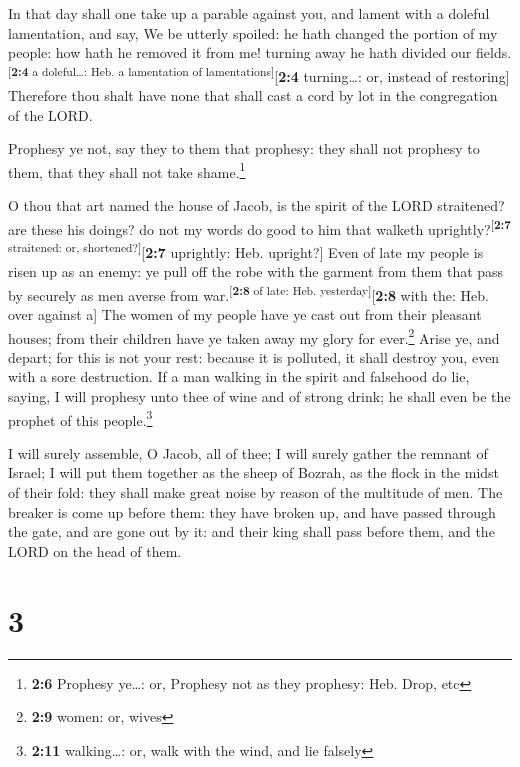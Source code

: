  In that day shall one take up a parable against you, and
lament with a doleful lamentation, and say, We be utterly spoiled: he
hath changed the portion of my people: how hath he removed it from me!
turning away he hath divided our fields.\textsuperscript{{[}\textbf{2:4}
a doleful\ldots: Heb. a lamentation of lamentations{]}}{[}\textbf{2:4}
turning\ldots: or, instead of restoring{]}  Therefore thou
shalt have none that shall cast a cord by lot in the congregation of the
LORD.

 Prophesy ye not, say they to them that prophesy: they
shall not prophesy to them, that they shall not take shame.\footnote{\textbf{2:6}
  Prophesy ye\ldots: or, Prophesy not as they prophesy: Heb. Drop, etc}

 O thou that art named the house of Jacob, is the spirit
of the LORD straitened? are these his doings? do not my words do good to
him that walketh uprightly?\textsuperscript{{[}\textbf{2:7} straitened:
or, shortened?{]}}{[}\textbf{2:7} uprightly: Heb. upright?{]}
 Even of late my people is risen up as an enemy: ye pull
off the robe with the garment from them that pass by securely as men
averse from war.\textsuperscript{{[}\textbf{2:8} of late: Heb.
yesterday{]}}{[}\textbf{2:8} with the: Heb. over against a{]}
 The women of my people have ye cast out from their
pleasant houses; from their children have ye taken away my glory for
ever.\footnote{\textbf{2:9} women: or, wives}  Arise ye,
and depart; for this is not your rest: because it is polluted, it shall
destroy you, even with a sore destruction.  If a man
walking in the spirit and falsehood do lie, saying, I will prophesy unto
thee of wine and of strong drink; he shall even be the prophet of this
people.\footnote{\textbf{2:11} walking\ldots: or, walk with the wind,
  and lie falsely}

 I will surely assemble, O Jacob, all of thee; I will
surely gather the remnant of Israel; I will put them together as the
sheep of Bozrah, as the flock in the midst of their fold: they shall
make great noise by reason of the multitude of men.  The
breaker is come up before them: they have broken up, and have passed
through the gate, and are gone out by it: and their king shall pass
before them, and the LORD on the head of them.

\hypertarget{section-2}{%
\section{3}\label{section-2}}

